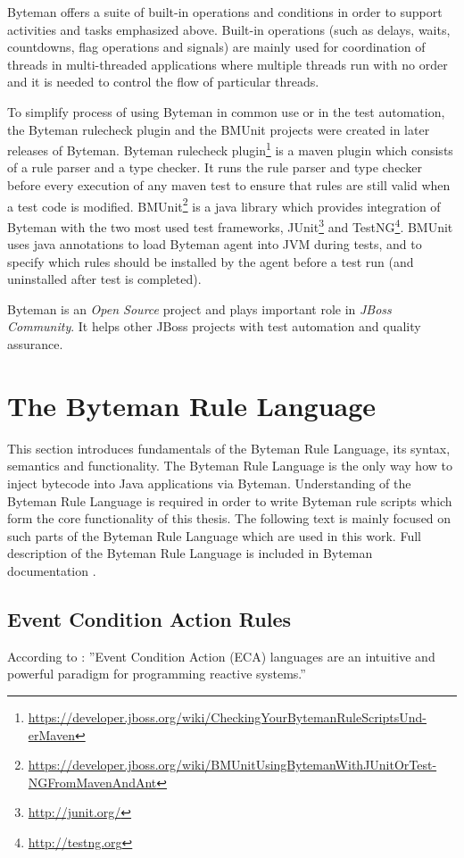 \documentclass[12pt,oneside]{fithesis2}
\begin{document}
Byteman offers a suite of built-in operations and conditions in order to support activities and tasks emphasized above. Built-in operations (such as delays, waits, countdowns, flag operations and signals) are mainly used for coordination of threads in multi-threaded applications where multiple threads run with no order and it is needed to control the flow of particular threads.

To simplify process of using Byteman in common use or in the test automation, the Byteman rulecheck plugin and the BMUnit projects were created in later releases of Byteman. Byteman rulecheck plugin\footnote{\url{https://developer.jboss.org/wiki/CheckingYourBytemanRuleScriptsUnd-erMaven}} is a maven plugin which consists of a rule parser and a type checker. It runs the rule parser and type checker before every execution of any maven test to ensure that rules are still valid when a test code is modified. BMUnit\footnote{\url{https://developer.jboss.org/wiki/BMUnitUsingBytemanWithJUnitOrTest-NGFromMavenAndAnt}} is a java library which provides integration of Byteman with the two most used test frameworks, JUnit\footnote{\url{http://junit.org/}} and TestNG\footnote{\url{http://testng.org}}. BMUnit uses java annotations to load Byteman agent into JVM during tests, and to specify which rules should be installed by the agent before a test run (and uninstalled after test is completed).

Byteman is an \textit{Open Source} project and plays important role in \textit{JBoss Community}. It helps other JBoss projects with test automation and quality assurance.

\section{The Byteman Rule Language}
This section introduces fundamentals of the Byteman Rule Language, its syntax, semantics and functionality. The Byteman Rule Language is the only way how to inject bytecode into Java applications via Byteman. Understanding of the Byteman Rule Language is required in order to write Byteman rule scripts which form the core functionality of this thesis. The following text is mainly focused on such parts of the Byteman Rule Language which are used in this work. Full description of the Byteman Rule Language is included in Byteman documentation \cite[The Byteman Rule Language]{byteman_doc}.

\subsection{Event Condition Action Rules}
\label{subsec:eca_sec}
According to \cite{eca}: ''Event Condition Action (ECA) languages are an intuitive and powerful paradigm for programming reactive systems.'' 
\end{document}
